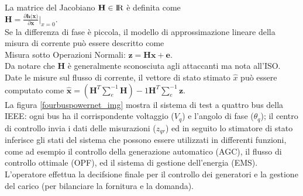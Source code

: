 La matrice del Jacobiano $\textbf{H} \in {\rm I\!R}$ è definita come\\
\indent$\textbf{H}=\frac{\partial\textbf{h(x)}}{\partial\textbf{x}}|_{x=0}$.\\
Se la differenza di fase è piccola, il modello di approssimazione lineare della misura di corrente può essere descritto come\\
\indent Misura sotto Operazioni Normali: $\textbf{z} =  \textbf{Hx} + \textbf{e}$.\\
Da notare che $\textbf{H}$ è generalmente sconosciuta agli attaccanti ma nota all'ISO. Date le misure sul flusso di corrente, il vettore di stato stimato $\widehat{x}$ può essere computato come $\widehat{\textbf{x}} = (\textbf{H}^T\sum_e^{-1}\textbf{H})-1\textbf{H}^T\sum_e^{-1}\textbf{z}$.\\
La figura \ref{fourbuspowernet_img} mostra il sistema di test a quattro bus della IEEE: ogni bus ha il corrispondente voltaggio ($V_q$) e l'angolo di fase ($\theta_q$); il centro di controllo invia i dati delle misurazioni ($z_{qr}$) ed in seguito lo stimatore di stato inferisce gli stati del sistema che possono essere utilizzati in differenti funzioni, come ad esempio il controllo della generazione automatico (AGC), il flusso di controllo ottimale (OPF), ed il sistema di gestione dell'energia (EMS). L'operatore effettua la decifsione finale per il controllo dei generatori e la gestione del carico (per bilanciare la fornitura e la domanda).
